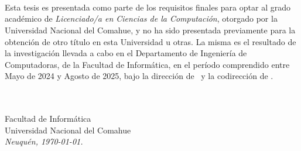 \ \\
\ \\
\label{pagpref}
\\
\ \\
\ \\

\ \\

\ \\
\ \\


Esta tesis es presentada como parte de los requisitos finales para optar al grado acad\'emico de {\em Licenciado/a en Ciencias de la Computación}, otorgado por la Universidad Nacional del Comahue, y no ha sido presentada previamente para la obtención de otro título en esta Universidad u otras. La misma es el resultado de la investigación llevada a cabo en el Departamento de Ingeniería de Computadoras, de la Facultad de Informática, en el período comprendido entre Mayo de 2024 y Agosto de 2025, bajo la dirección de \nombredirector \if\nombrecodirector 
\else
\ y la codirección de  \nombrecodirector
\fi
.




\vspace{3cm}


\ \\
{\flushright \nombretesista\\
{\sc Facultad de Informática \\
Universidad Nacional del Comahue}\\
{\em Neuqu\'en, \today{}.}\\}

\vfill

